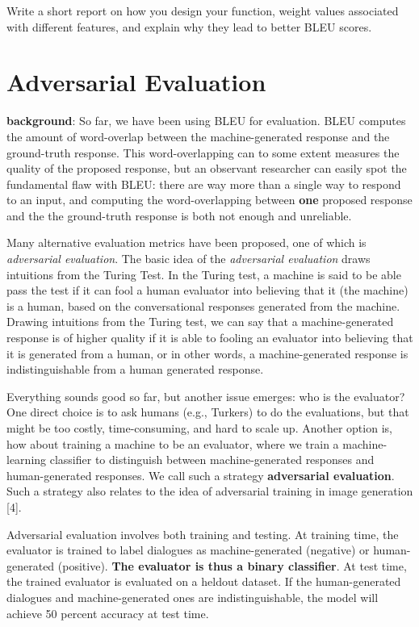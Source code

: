 \documentclass{article}
\begin{document}
Write a short report on how you design your function,  weight values associated with different features, and explain why they lead to better BLEU scores. 

\section{Adversarial Evaluation}
{\bf background}:
So far, we have been using BLEU for evaluation. 
BLEU computes the amount
of word-overlap between the machine-generated response and
the ground-truth response. This word-overlapping can to some extent measures the quality of the proposed response, but an observant researcher can easily spot the fundamental  flaw with BLEU: there are way more than a single way to respond to an input, and computing the word-overlapping between {\bf one} proposed response and the the ground-truth response is both not enough and unreliable. 

Many alternative evaluation metrics have been proposed, one of which is {\it adversarial evaluation}. The basic idea of the {\it adversarial evaluation} draws intuitions from the  Turing Test. In the Turing test, 
a machine is said to be able pass the test if it can fool a human evaluator into believing that it (the machine) is a human, based on the conversational responses generated from the machine. 
Drawing intuitions from the Turing test, we can say that a machine-generated response is of higher quality if it is able to fooling an evaluator into believing that it is generated from a human, or in other words, 
a machine-generated response 
 is indistinguishable from a human generated response. 

Everything sounds good so far, but another issue emerges: who is the evaluator? One direct choice is to ask humans (e.g., Turkers) to do the evaluations, but that might be too costly, time-consuming, and  hard to scale up. Another option is, how about training a machine to be an evaluator, where we train a machine-learning classifier to distinguish between machine-generated responses and human-generated responses. We call such a strategy {\bf adversarial evaluation}. Such a strategy also relates to the idea of adversarial training in image generation [4]. 

Adversarial evaluation involves both training
and testing. At training time, the evaluator is
trained to label dialogues as machine-generated
(negative) or human-generated (positive). 
{\bf The evaluator is thus a binary classifier}.
At test
time, the trained evaluator is evaluated on a heldout
dataset. If the human-generated dialogues and
machine-generated ones are indistinguishable, the
model will achieve 50 percent accuracy at test
time.
\end{document}
